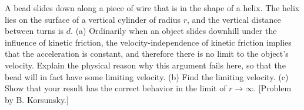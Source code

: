 A bead slides down along a piece of wire that is in the shape of a helix. The helix lies on the surface of
a vertical cylinder of radius $r$, and the vertical distance between turns is $d$.\hwendpart
(a) Ordinarily when an object slides downhill under the influence of kinetic friction, the velocity-independence
of kinetic friction implies that the acceleration is constant, and therefore there is no limit to the object's
velocity. Explain the physical reason why this argument fails here, so that the bead will in fact have some
limiting velocity.\hwendpart
(b) Find the limiting velocity.\hwendpart
(c) Show that your result has the correct behavior in the limit of $r \rightarrow \infty$.
[Problem by B. Korsunsky.]\answercheck
